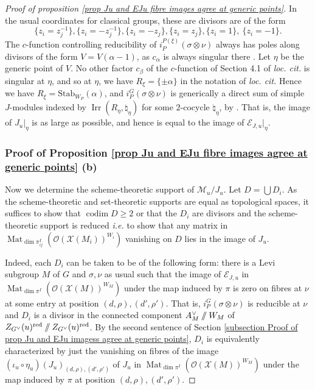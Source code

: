 \documentclass[10pt]{article}
\DeclareMathOperator{\codim}{codim}
\newcommand{\stab}[2]{\mathrm{Stab}_{#1}(#2)}
\DeclareMathOperator{\Mat}{Mat}
\DeclareMathOperator{\Irr}{Irr}
\newcommand{\git}{\mathbin{
  \mathchoice{/\mkern-6mu/}%
    {/\mkern-6mu/}%
    {/\mkern-5mu/}%
    {/\mkern-5mu/}}}%
\newcommand{\X}{\mathcal{X}}
\newcommand{\Ee}{\mathcal{E}}
\newcommand{\Oo}{\mathcal{O}}
\theoremstyle{definition}
\theoremstyle{remark}
\newcommand{\Zur}{Z_{G^\vee}(u)^{\mathrm{red}}}
\begin{document}
\begin{proof}[Proof of proposition \ref{prop Ju and EJu fibre images agree at generic points}]
In the usual coordinates for classical groups, these are divisors are of the form
%
\[
\{z_i=z_j^{-1}\}, \{z_i=-z_j^{-1}\}, \{z_i=-z_j\}, \{z_i=z_j\}, \{z_i=1\}, ~\{z_i=-1\}.
\]
%
The $c$-function controlling reducibility of $i_{P}^{P(\xi)}(\sigma\otimes\nu)$  always has poles along 
divisors of the form $V=V(\alpha-1)$, as 
$c_\alpha$ is always singular there \cite[Eq. (3.4)]{SolSurvey}. 
Let $\eta$ be the generic point of $V$.
No other factor $c_\beta$ of the $c$-function of Section 4.1 of \textit{loc. cit.} is singular at 
$\eta$, and so at $\eta$, we have $R_{\xi}=\{\pm \alpha\}$ in the notation of \textit{loc. cit.}
Hence we have $R_\xi=\stab{W_P}{\alpha}$, and $i_{P}^G(\sigma\otimes\nu)$ is generically a 
direct sum of simple $J$-modules indexed by $\Irr(R_\eta, \natural_\eta)$ for some $2$-cocycle $\natural_\eta$, by \cite[Theorem 4.2]{SolSurvey}.
That is, the image of $J_u|_\eta$ is as large as possible, and hence is equal to the image
of $\Ee_{J,u}|_\eta$.

\subsubsection{Proof of Proposition \ref{prop Ju and EJu fibre images agree at generic points} (b)}
\label{subsubsection proof of (b)}
Now we determine the scheme-theoretic support of $\mathcal{M}_u/J_u$. Let $D=\bigcup D_i$.
As the scheme-theoretic and set-theoretic supports are equal as topological 
spaces, it suffices to show that $\codim D\geq 2$ or that the $D_i$ are divisors and the scheme-theoretic support is reduced \textit{i.e.} to show 
that any matrix in
$\Mat_{\dim\pi_{ij}^I}\left(\Oo\left(\X(M_i)\right)^{W_i}\right)$ vanishing on $D$ lies in the image of $J_u$. 

Indeed, each $D_i$ can be taken to be of the following form: there is a Levi subgroup $M$ of $G$
and $\sigma,\nu$ as usual such that the image of $\Ee_{J,u}$ in
$\Mat_{\dim\pi^I}(\Oo(\X(M))^{W_M})$ under the map induced by $\pi$ is zero on fibres at $\nu$ at some entry 
at position $(d,\rho),(d',\rho')$. That is, $i_P^G(\sigma\otimes\nu)$ is reducible at $\nu$ and $D_i$
is a divisor in the connected component $A_M^\vee\git W_M$ of $\Zur\git\Zur$.
By the second sentence of Section \ref{subsection Proof of prop Ju and EJu imagess agree at generic points}, $D_i$ is equivalently characterized by just the vanishing on fibres of the image 
$(\iota_u\circ\eta_u)(J_u)_{(d,\rho), (d',\rho')}$ of $J_u$ in 
$\Mat_{\dim\pi^I}(\Oo(\X(M))^{W_M})$ under the map induced by $\pi$  at 
position $(d,\rho),(d',\rho')$. 


\end{proof}
\end{document}
